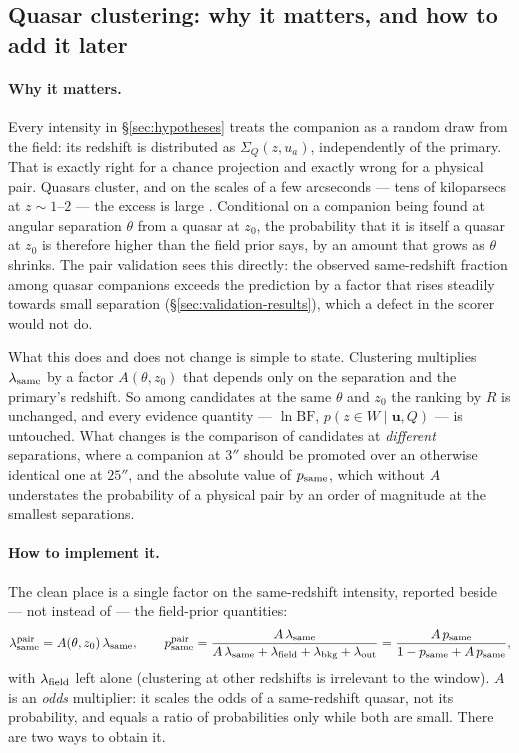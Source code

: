 \documentclass[11pt,a4paper]{article}
\newcommand{\uvec}{\mathbf{u}}
\newcommand{\Sq}{\Sigma_{Q}}
\begin{document}
\subsection{Quasar clustering: why it matters, and how to add it later}
\label{sec:clustering-later}

\paragraph{Why it matters.} Every intensity in \S\ref{sec:hypotheses} treats
the companion as a random draw from the field: its redshift is distributed as
$\Sq(z,u_a)$, independently of the primary. That is exactly right for a chance
projection and exactly wrong for a physical pair. Quasars cluster, and on the
scales of a few arcseconds --- tens of kiloparsecs at $z\sim1$--$2$ --- the
excess is large \citep{hennawi2006,eftekharzadeh2017}. Conditional on a
companion being found at angular separation $\theta$ from a quasar at $z_0$,
the probability that it is itself a quasar at $z_0$ is therefore higher than the
field prior says, by an amount that grows as $\theta$ shrinks. The pair
validation sees this directly: the observed same-redshift fraction among quasar
companions exceeds the prediction by a factor that rises steadily towards small
separation (\S\ref{sec:validation-results}), which a defect in the scorer would
not do.

What this does and does not change is simple to state. Clustering multiplies
$\lambda_{\rm same}$ by a factor $A(\theta,z_0)$ that depends only on the
separation and the primary's redshift. So among candidates at the same $\theta$
and $z_0$ the ranking by $R$ is unchanged, and every evidence quantity ---
$\ln\mathrm{BF}$, $p(z\in W\mid\uvec,Q)$ --- is untouched. What changes is the
comparison of candidates at \emph{different} separations, where a companion at
$3''$ should be promoted over an otherwise identical one at $25''$, and the
absolute value of $p_{\rm same}$, which without $A$ understates the probability
of a physical pair by an order of magnitude at the smallest separations.

\paragraph{How to implement it.} The clean place is a single factor on the
same-redshift intensity, reported beside --- not instead of --- the field-prior
quantities:
%
\begin{equation}
\lambda_{\rm same}^{\rm pair} = A(\theta,z_0)\,\lambda_{\rm same},
\qquad
p_{\rm same}^{\rm pair} =
\frac{A\,\lambda_{\rm same}}{A\,\lambda_{\rm same}+\lambda_{\rm field}+\lambda_{\rm bkg}+\lambda_{\rm out}}
= \frac{A\,p_{\rm same}}{1-p_{\rm same}+A\,p_{\rm same}} ,
\end{equation}
%
with $\lambda_{\rm field}$ left alone (clustering at other redshifts is
irrelevant to the window). $A$ is an \emph{odds} multiplier: it scales the odds
of a same-redshift quasar, not its probability, and equals a ratio of
probabilities only while both are small. There are two ways to obtain it.
\end{document}
